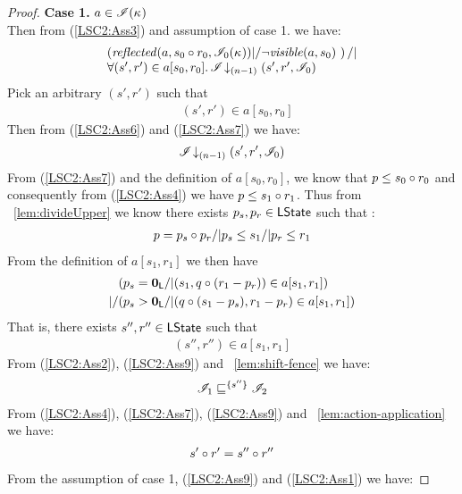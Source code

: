 \begin{lemma}
\begin{proof}
\noindent\textbf{Case 1. } $a \in \mathscr{I}(\kappa_{})$\\
Then from (\ref{LSC2:Ass3}) and assumption of case 1. we have:
%
\begin{align}
	\begin{array}{@{} l @{}}
		\left(\m{reflected}(a, s_0 \composeL r_0, \lmod_0(\ca{})) |/ \neg\m{visible}(a, s_0) \ \right) /| \\
		\for{(s', r') \in a[s_0, r_0]} \extendsAMUpto{\lmod}{(n-1)}{s'}{r'}{\lmod_0}
 	\end{array}
 	\label{LSC2:Ass6}
\end{align}
%
Pick an arbitrary $(s', r')$ such that
%
\begin{align}
	& (s', r') \in a[s_0, r_0] \label{LSC2:Ass7}
\end{align}
Then from (\ref{LSC2:Ass6}) and (\ref{LSC2:Ass7}) we have:
%
\begin{align}
	\mathscr{I} \!\downarrow_{(n-1)} \left(s', r', \mathscr{I}_0\right) \label{LSC2:Ass8}
\end{align}
%
From (\ref{LSC2:Ass7}) and the definition of $a[s_0, r_0]$, we know that $p \leq s_0 \circ r_0$ and consequently from (\ref{LSC2:Ass4}) we have $p \leq s_1 \circ r_1$. Thus from \lem~\ref{lem:divideUpper} we know there exists $p_s, p_r \in \textsf{LState}$ such that : 
%
\begin{align*}
	p = p_s \circ p_r /| p_s \leq s_1 /| p_r \leq r_1
\end{align*}
%
From the definition of $a[s_1, r_1]$ we then have
%
\begin{align*}
	& (p_s = \mathbf{0}_{\textsf{L}} /| (s_1, q \circ (r_1 -p_r)) \in a[s_1, r_1])\\
	|/ & (p_s > \mathbf{0}_{\textsf{L}} /| (q \circ (s_1 - p_s), r_1 - p_r) \in a[s_1, r_1]) 
\end{align*}
%
That is, there exists $s'', r'' \in \textsf{LState}$ such that
%
\begin{align}
	(s'', r'') \in a[s_1, r_1]
	\label{LSC2:Ass9}
\end{align}
%
From (\ref{LSC2:Ass2}), (\ref{LSC2:Ass9}) and \lem~\ref{lem:shift-fence} we have:
%
\begin{align}
	\mathscr{I}_1 \sqsubseteq^{\{s''\}} \mathscr{I}_2 \label{LSC2:Ass10}
\end{align}
%
From (\ref{LSC2:Ass4}), (\ref{LSC2:Ass7}), (\ref{LSC2:Ass9}) and \lem~\ref{lem:action-application} we have:
%
\begin{align}
	s' \circ r' = s'' \circ r'' \label{LSC2:Ass11}
\end{align}
%
From the assumption of case 1, (\ref{LSC2:Ass9}) and (\ref{LSC2:Ass1}) we have: 

\end{proof}
\end{lemma}
